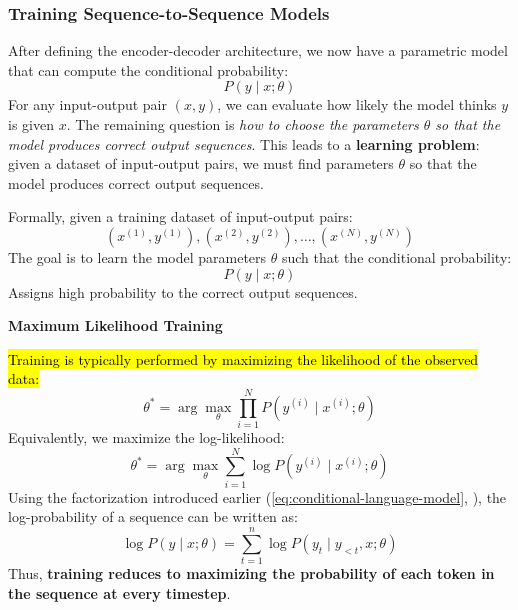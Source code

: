 \subsubsection{Training Sequence-to-Sequence Models}

After defining the encoder-decoder architecture, we now have a parametric model that can compute the conditional probability:
\begin{equation*}
    P\left(y \mid x; \theta\right)
\end{equation*}
For any input-output pair $(x, y)$, we can evaluate how likely the model thinks $y$ is given $x$. The remaining question is \emph{how to choose the parameters $\theta$ so that the model produces correct output sequences}. This leads to a \textbf{learning problem}: given a dataset of input-output pairs, we must find parameters $\theta$ so that the model produces correct output sequences.

\highspace
Formally, given a training dataset of input-output pairs:
\begin{equation*}
    \left(x^{(1)}, y^{(1)}\right), \left(x^{(2)}, y^{(2)}\right), \dots, \left(x^{(N)}, y^{(N)}\right)
\end{equation*}
The goal is to learn the model parameters $\theta$ such that the conditional probability:
\begin{equation*}
    P\left(y \mid x; \theta\right)
\end{equation*}
Assigns high probability to the correct output sequences.

\highspace
\begin{flushleft}
    \textcolor{Green3}{ \textbf{Maximum Likelihood Training}}
\end{flushleft}
\hl{Training is typically performed by maximizing the likelihood of the observed data:}
\begin{equation*}
    \theta^{*} = \arg\max_{\theta} \prod_{i=1}^{N} P\left(y^{(i)} \mid x^{(i)}; \theta\right)
\end{equation*}
Equivalently, we maximize the log-likelihood:
\begin{equation*}
    \theta^{*} = \arg\max_{\theta} \sum_{i=1}^{N} \log P\left(y^{(i)} \mid x^{(i)}; \theta\right)
\end{equation*}
Using the factorization introduced earlier (\autoref{eq:conditional-language-model}, ), the log-probability of a sequence can be written as:
\begin{equation*}
    \log P\left(y \mid x; \theta\right)
    =
    \sum_{t=1}^{n} \log P\left(y_t \mid y_{<t}, x; \theta\right)
\end{equation*}
Thus, \textbf{training reduces to maximizing the probability of each token in the sequence at every timestep}.

